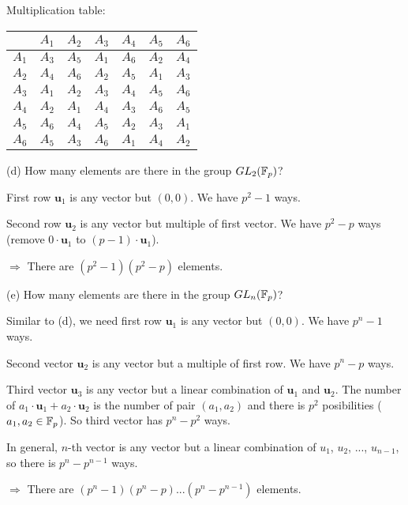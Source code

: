Multiplication table:

\begin{center}
    \begin{tabular}{|c||c|c|c|c|c|c|}
        \hline
        & $A_1$ & $A_2$ & $A_3$ & $A_4$ & $A_5$ & $A_6$ \\ \hline\hline
        $A_1$ & $A_3$ & $A_5$ & $A_1$ & $A_6$ & $A_2$ & $A_4$ \\ \hline
        $A_2$ & $A_4$ & $A_6$ & $A_2$ & $A_5$ & $A_1$ & $A_3$ \\ \hline
        $A_3$ & $A_1$ & $A_2$ & $A_3$ & $A_4$ & $A_5$ & $A_6$ \\ \hline
        $A_4$ & $A_2$ & $A_1$ & $A_4$ & $A_3$ & $A_6$ & $A_5$ \\ \hline
        $A_5$ & $A_6$ & $A_4$ & $A_5$ & $A_2$ & $A_3$ & $A_1$ \\ \hline
        $A_6$ & $A_5$ & $A_3$ & $A_6$ & $A_1$ & $A_4$ & $A_2$ \\
        \hline
    \end{tabular}
\end{center}

(d) How many elements are there in the group $GL_2(\mathbb{F}_p)$?
    
First row $\bm{u}_1$ is any vector but $(0, 0)$. We have $p^2-1$ ways.

Second row $\bm{u}_2$ is any vector but multiple of first vector. We have $p^2-p$ ways (remove $0 \cdot \bm{u}_1$ to $(p-1) \cdot \bm{u}_1$).

$\Rightarrow$ There are $(p^2-1)(p^2-p)$ elements.

(e) How many elements are there in the group $GL_n(\mathbb{F}_p)$?
    
Similar to (d), we need first row $\bm{u}_1$ is any vector but $(0,0)$. We have $p^n-1$ ways.

Second vector $\bm{u}_2$ is any vector but a multiple of first row. We have $p^n-p$ ways.

Third vector $\bm{u}_3$ is any vector but a linear combination of $\bm{u}_1$ and $\bm{u}_2$. The number of $a_1 \cdot \bm{u}_1 + a_2 \cdot \bm{u}_2$ is the number of pair $(a_1, a_2)$ and there is $p^2$ posibilities ($a_1, a_2 \in \mathbb{F}_p$). So third vector has $p^n-p^2$ ways.

In general, $n$-th vector is any vector but a linear combination of $u_1$, $u_2$, ..., $u_{n-1}$, so there is $p^n-p^{n-1}$ ways.

$\Rightarrow$ There are $(p^n-1)(p^n-p)...(p^n-p^{n-1})$ elements.

